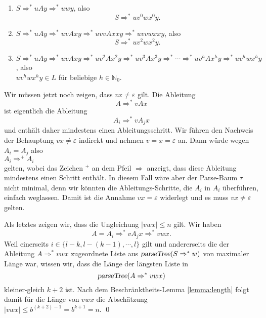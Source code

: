 \begin{enumerate}
\item $S \Rightarrow^* uAy \Rightarrow^* uwy$, also
      \[ S \Rightarrow^* uv^0wx^0y. \]
\item $S \Rightarrow^* uAy \Rightarrow^* uvAxy \Rightarrow^* uvvAxxy \Rightarrow^* uvvwxxy$, also
      \[ S \Rightarrow^* uv^2wx^2y. \]
\item $S \Rightarrow^* uAy \Rightarrow^* uvAxy \Rightarrow^* uv^2Ax^2y \Rightarrow^* uv^3Ax^3y
       \Rightarrow^* \cdots \Rightarrow^* uv^hAx^hy \Rightarrow^* uv^hwx^hy$, also
      \\[0.2cm]
      \hspace*{1.3cm}
      $uv^hwx^hy \in L$ \quad f\"ur beliebige $h \in \mathbb{N}_0$.
      \vspace*{0.2cm}

\end{enumerate}
Wir m\"ussen jetzt noch zeigen, dass $vx \not= \varepsilon$ gilt.  Die Ableitung
\[ A \Rightarrow^* vAx \]
ist eigentlich die Ableitung
\[ A_i \Rightarrow^* vA_jx \]
und enth\"alt daher mindestens einen Ableitungsschritt.
Wir f\"uhren den Nachweis der Behauptung $vx \not= \varepsilon$ indirekt und nehmen $v = x =
\varepsilon$ an.
Dann w\"urde wegen $A_i = A_j$ also
\\[0.2cm]
\hspace*{1.3cm}
$A_i \Rightarrow^+ A_i$
\\[0.2cm]
gelten, wobei das Zeichen $^+$ an dem Pfeil $\Rightarrow$ anzeigt, dass diese Ableitung
mindestens einen Schritt 
enth\"alt.  In diesem Fall w\"are aber der Parse-Baum $\tau$ nicht minimal, denn wir k\"onnten
die Ableitungs-Schritte, die $A_i$ in $A_i$ \"uberf\"uhren, einfach weglassen.
Damit ist die Annahme $vx = \varepsilon$ widerlegt und es muss $vx \not= \varepsilon$ gelten.
\vspace*{0.2cm}

Als letztes zeigen wir, dass die Ungleichung $|vwx| \leq n$ gilt.  Wir haben
\[ A = A_i \Rightarrow^* vA_jx \Rightarrow^* vwx. \]
Weil einerseits $i \in \{l-k, l-(k-1), \cdots,l \}$ gilt und andererseits die der
Ableitung
$A \Rightarrow^* vwx$ zugeordnete Liste aus $\textsl{parseTree}(S \Rightarrow^* w)$ von
maximaler L\"ange war, wissen wir, 
dass die L\"ange der l\"angsten Liste in 
\[ \textsl{parseTree}(A \Rightarrow^* vwx) \]
kleiner-gleich  $k+2$ ist.
  Nach dem Beschr\"anktheits-Lemma
\ref{lemma:length} folgt damit f\"ur die L\"ange von $vwx$ die Absch\"atzung
\\[0.2cm]
\hspace*{1.3cm}
$|vwx| \leq b^{(k+2)-1} = b^{k+1} = n$.   \qed


